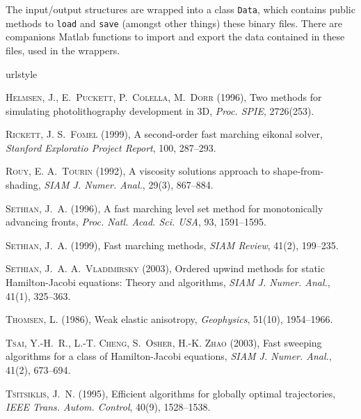 \documentclass{article}
\begin{document}
The input/output structures are wrapped into a class \verb+Data+, which contains public methods to \verb+load+ and \verb+save+ (amongst other things) these binary files. There are companions Matlab functions to import and export the data contained in these files, used in the wrappers.


\begin{thebibliography}{9}
\providecommand{\natexlab}[1]{#1}
\expandafter\ifx\csname urlstyle\endcsname\relax
  \providecommand{\doi}[1]{doi:\discretionary{}{}{}#1}\else
  \providecommand{\doi}{doi:\discretionary{}{}{}\begingroup
  \urlstyle{rm}\Url}\fi

\newcommand{\Capitalize}[1]{\uppercase{#1}}
\newcommand{\capitalize}[1]{\expandafter\Capitalize#1}

\textsc{Helmsen, J.}, \textsc{E.~Puckett}, \textsc{P.~Colella}, \bbland{}
  \textsc{M.~Dorr} (1996), Two methods for simulating photolithography
  development in {3D}, \emph{Proc. SPIE}, 2726(253).

\textsc{Rickett, J.} \bbland{} \textsc{S.~Fomel} (1999), A second-order fast
  marching eikonal solver, \emph{Stanford Exploratio Project Report}, 100,
  287--293.

\textsc{Rouy, E.} \bbland{} \textsc{A.~Tourin} (1992), A viscosity solutions
  approach to shape-from-shading, \emph{{SIAM} J. Numer. Anal.}, 29(3),
  867--884.

\textsc{Sethian, J.~A.} (1996), A fast marching level set method for
  monotonically advancing fronts, \emph{Proc. Natl. Acad. Sci. USA}, 93,
  1591--1595.

\textsc{Sethian, J.~A.} (1999), Fast marching methods, \emph{{SIAM} Review},
  41(2), 199--235.

\textsc{Sethian, J.~A.} \bbland{} \textsc{A.~Vladimirsky} (2003), Ordered
  upwind methods for static {H}amilton-{J}acobi equations: {T}heory and
  algorithms, \emph{{SIAM} J. Numer. Anal.}, 41(1), 325--363.

\textsc{Thomsen, L.} (1986), Weak elastic anisotropy, \emph{Geophysics},
  51(10), 1954--1966.

\textsc{Tsai, Y.-H.~R.}, \textsc{L.-T. Cheng}, \textsc{S.~Osher}, \bbland{}
  \textsc{H.-K. Zhao} (2003), Fast sweeping algorithms for a class of
  {H}amilton-{J}acobi equations, \emph{SIAM J. Numer. Anal.}, 41(2), 673--694.

\textsc{Tsitsiklis, J.~N.} (1995), Efficient algorithms for globally optimal
  trajectories, \emph{{IEEE} Trans. Autom. Control}, 40(9), 1528--1538.

\end{thebibliography}
\end{document}
